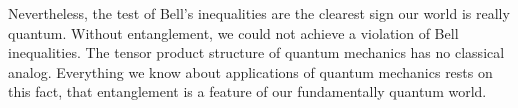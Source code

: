 Nevertheless, the test of Bell's inequalities are the clearest sign our world is really quantum. Without entanglement, we could not achieve a violation of Bell inequalities. The tensor product structure of quantum mechanics has no classical analog. Everything we know about applications of quantum mechanics rests on this fact, that entanglement is a feature of our fundamentally quantum world.